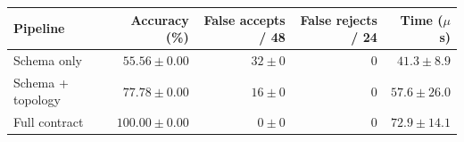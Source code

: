 \begin{tabular}{lrrrr}
\toprule
Pipeline & Accuracy (\%) & False accepts / 48 & False rejects / 24 & Time ($\mu$s) \\
\midrule
Schema only & $55.56 \pm 0.00$ & $32 \pm 0$ & 0 & $41.3 \pm 8.9$ \\
Schema + topology & $77.78 \pm 0.00$ & $16 \pm 0$ & 0 & $57.6 \pm 26.0$ \\
Full contract & $\mathbf{100.00 \pm 0.00}$ & $0 \pm 0$ & 0 & $72.9 \pm 14.1$ \\
\bottomrule
\end{tabular}
